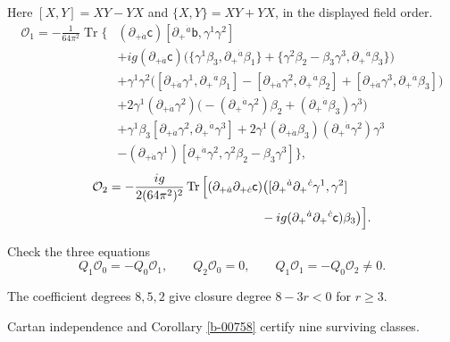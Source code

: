 \documentclass[11pt]{article}
\numberwithin{equation}{section}
\numberwithin{figure}{section}
\numberwithin{table}{section}
\begin{document}
\begin{proofbox}
Here $[X,Y]=XY-YX$ and $\{X,Y\}=XY+YX$, in the displayed field order.
\begin{equation}\label{eq-su3-example-first}
\begin{aligned}
\mathcal O_1=-\frac{1}{64\pi^2}
\operatorname{Tr}\Big\{
&(\partial_{+\dot a}\mathsf c)
[\partial_+{}^{\dot a}\mathsf b,\gamma^1\gamma^2]\\
&+ig(\partial_{+\dot a}\mathsf c)
\bigl(\{\gamma^1\beta_3,\partial_+{}^{\dot a}\beta_1\}
+\{\gamma^2\beta_2-\beta_3\gamma^3,
\partial_+{}^{\dot a}\beta_3\}\bigr)\\
&+\gamma^1\gamma^2\bigl(
[\partial_{+\dot a}\gamma^1,\partial_+{}^{\dot a}\beta_1]
-[\partial_{+\dot a}\gamma^2,\partial_+{}^{\dot a}\beta_2]
+[\partial_{+\dot a}\gamma^3,\partial_+{}^{\dot a}\beta_3]\bigr)\\
&+2\gamma^1(\partial_{+\dot a}\gamma^2)
\bigl(-(\partial_+{}^{\dot a}\gamma^2)\beta_2
+(\partial_+{}^{\dot a}\beta_3)\gamma^3\bigr)\\
&+\gamma^1\beta_3[\partial_{+\dot a}\gamma^2,\partial_+{}^{\dot a}\gamma^3]
+2\gamma^1(\partial_{+\dot a}\beta_3)(\partial_+{}^{\dot a}\gamma^2)\gamma^3\\
&-(\partial_{+\dot a}\gamma^1)
[\partial_+{}^{\dot a}\gamma^2,\gamma^2\beta_2-\beta_3\gamma^3]
\Big\},
\end{aligned}
\end{equation}
\begin{equation}\label{eq-su3-example-second}
\begin{aligned}
\mathcal O_2=-\frac{ig}
{2(64\pi^2)^2}\operatorname{Tr}\Big[&
(\partial_{+\dot a}\partial_{+\dot c}\mathsf c)
\bigl([\partial_+{}^{\dot a}\partial_+{}^{\dot c}\gamma^1,\gamma^2]\\
&\hspace{15mm}-ig(\partial_+{}^{\dot a}\partial_+{}^{\dot c}\mathsf c)\beta_3\bigr)
\Big].
\end{aligned}
\end{equation}

Check the three equations
\begin{equation}\label{b-00825}
Q_1\mathcal O_0=-Q_0\mathcal O_1,\qquad
Q_2\mathcal O_0=0,\qquad Q_1\mathcal O_1=-Q_0\mathcal O_2\ne0.
\end{equation}

The coefficient degrees $8,5,2$ give closure degree $8-3r<0$ for $r\ge3$.

Cartan independence and Corollary \ref{b-00758} certify nine surviving classes.
\end{proofbox}
\end{document}
